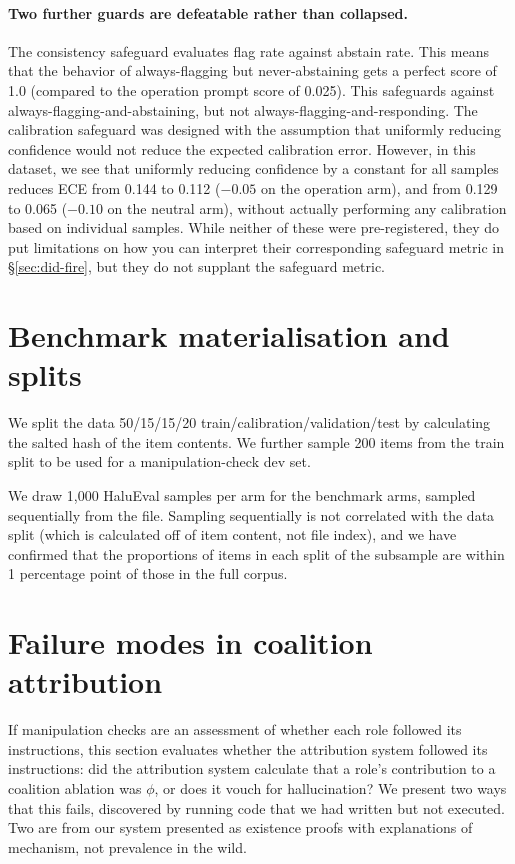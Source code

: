 \paragraph{Two further guards are defeatable rather than collapsed.}
The consistency safeguard evaluates flag rate against abstain rate. This means that the behavior of
always-flagging but never-abstaining gets a perfect score of 1.0 (compared to the operation prompt
score of 0.025). This safeguards against always-flagging-and-abstaining, but not
always-flagging-and-responding. The calibration safeguard was designed with the assumption that
uniformly reducing confidence would not reduce the expected calibration error. However, in this
dataset, we see that uniformly reducing confidence by a constant for all samples reduces ECE from
0.144 to 0.112 ($-0.05$ on the operation arm), and from 0.129 to 0.065 ($-0.10$ on the neutral arm),
without actually performing any calibration based on individual samples. While neither of these were
pre-registered, they do put limitations on how you can interpret their corresponding safeguard
metric in \S\ref{sec:did-fire}, but they do not supplant the safeguard metric.

\section{Benchmark materialisation and splits}
\label{app:splits}

We split the data 50/15/15/20 train/calibration/validation/test by calculating the salted hash of the
item contents. We further sample 200 items from the train split to be used for a manipulation-check
dev set.

We draw 1,000 HaluEval samples per arm for the benchmark arms, sampled sequentially from the file.
Sampling sequentially is not correlated with the data split (which is calculated off of item
content, not file index), and we have confirmed that the proportions of items in each split of the
subsample are within 1 percentage point of those in the full corpus.

\section{Failure modes in coalition attribution}
\label{app:attribution-failures}

If manipulation checks are an assessment of whether each role followed its instructions, this section
evaluates whether the attribution system followed its instructions: did the attribution system
calculate that a role's contribution to a coalition ablation was $\phi$, or does it vouch for
hallucination? We present two ways that this fails, discovered by running code that we had written
but not executed. Two are from our system presented as existence proofs with explanations of
mechanism, not prevalence in the wild.

